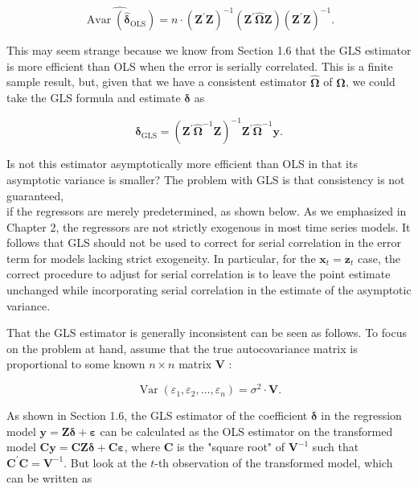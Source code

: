 \documentclass[10pt]{article}
\begin{document}
\begin{equation*}
\widehat{\operatorname{Avar}\left(\hat{\boldsymbol{\delta}}_{\mathrm{OLS}}\right)}=n \cdot\left(\mathbf{Z}^{\prime} \mathbf{Z}\right)^{-1}\left(\mathbf{Z}^{\prime} \hat{\mathbf{\Omega}} \mathbf{Z}\right)\left(\mathbf{Z}^{\prime} \mathbf{Z}\right)^{-1} . \tag{6.7.11}
\end{equation*}


This may seem strange because we know from Section 1.6 that the GLS estimator is more efficient than OLS when the error is serially correlated. This is a finite sample result, but, given that we have a consistent estimator $\widehat{\boldsymbol{\Omega}}$ of $\boldsymbol{\Omega}$, we could take the GLS formula and estimate $\boldsymbol{\delta}$ as

$$
\hat{\boldsymbol{\delta}}_{\mathrm{GLS}}=\left(\mathbf{Z}^{\prime} \hat{\boldsymbol{\Omega}}^{-1} \mathbf{Z}\right)^{-1} \mathbf{Z}^{\prime} \hat{\boldsymbol{\Omega}}^{-1} \mathbf{y} .
$$

Is not this estimator asymptotically more efficient than OLS in that its asymptotic variance is smaller? The problem with GLS is that consistency is not guaranteed,\\
if the regressors are merely predetermined, as shown below. As we emphasized in Chapter 2, the regressors are not strictly exogenous in most time series models. It follows that GLS should not be used to correct for serial correlation in the error term for models lacking strict exogeneity. In particular, for the $\mathbf{x}_{t}=\mathbf{z}_{t}$ case, the correct procedure to adjust for serial correlation is to leave the point estimate unchanged while incorporating serial correlation in the estimate of the asymptotic variance.

That the GLS estimator is generally inconsistent can be seen as follows. To focus on the problem at hand, assume that the true autocovariance matrix is proportional to some known $n \times n$ matrix $\mathbf{V}$ :

$$
\operatorname{Var}\left(\varepsilon_{1}, \varepsilon_{2}, \ldots, \varepsilon_{n}\right)=\sigma^{2} \cdot \mathbf{V} .
$$

As shown in Section 1.6, the GLS estimator of the coefficient $\boldsymbol{\delta}$ in the regression model $\mathbf{y}=\mathbf{Z} \boldsymbol{\delta}+\boldsymbol{\varepsilon}$ can be calculated as the OLS estimator on the transformed model $\mathbf{C y}=\mathbf{C Z} \boldsymbol{\delta}+\mathbf{C} \boldsymbol{\varepsilon}$, where $\mathbf{C}$ is the "square root" of $\mathbf{V}^{-1}$ such that $\mathbf{C}^{\prime} \mathbf{C}=\mathbf{V}^{-1}$. But look at the $t$-th observation of the transformed model, which can be written as
\end{document}
